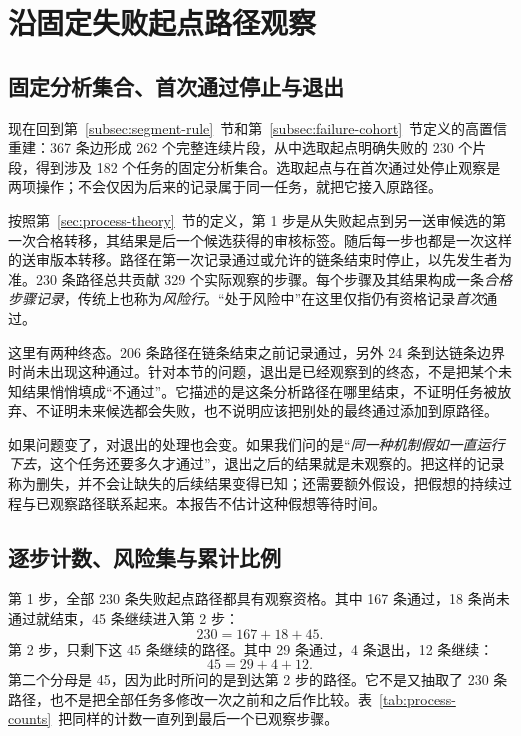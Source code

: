 \section{沿固定失败起点路径观察}
\label{sec:process}

\subsection{固定分析集合、首次通过停止与退出}
\label{subsec:process-cohort}
现在回到第~\ref{subsec:segment-rule}~节和第~\ref{subsec:failure-cohort}~节定义的高置信重建：367 条边形成 262 个完整连续片段，从中选取起点明确失败的 230 个片段，得到涉及 182 个任务的固定分析集合。选取起点与在首次通过处停止观察是两项操作；不会仅因为后来的记录属于同一任务，就把它接入原路径。

按照第~\ref{sec:process-theory}~节的定义，第 1 步是从失败起点到另一送审候选的第一次合格转移，其结果是后一个候选获得的审核标签。随后每一步也都是一次这样的送审版本转移。路径在第一次记录通过或允许的链条结束时停止，以先发生者为准。230 条路径总共贡献 329 个实际观察的步骤。每个步骤及其结果构成一条\emph{合格步骤记录}，传统上也称为\emph{风险行}。“处于风险中”在这里仅指仍有资格记录\emph{首次}通过。

这里有两种终态。206 条路径在链条结束之前记录通过，另外 24 条到达链条边界时尚未出现这种通过。针对本节的问题，退出是已经观察到的终态，不是把某个未知结果悄悄填成“不通过”。它描述的是这条分析路径在哪里结束，不证明任务被放弃、不证明未来候选都会失败，也不说明应该把别处的最终通过添加到原路径。

如果问题变了，对退出的处理也会变。如果我们问的是“\emph{同一种机制假如一直运行下去}，这个任务还要多久才通过”，退出之后的结果就是未观察的。把这样的记录称为删失，并不会让缺失的后续结果变得已知；还需要额外假设，把假想的持续过程与已观察路径联系起来。本报告不估计这种假想等待时间。

\subsection{逐步计数、风险集与累计比例}
\label{subsec:risk-counts}
第 1 步，全部 230 条失败起点路径都具有观察资格。其中 167 条通过，18 条尚未通过就结束，45 条继续进入第 2 步：
\[
230=167+18+45.
\]
第 2 步，只剩下这 45 条继续的路径。其中 29 条通过，4 条退出，12 条继续：
\[
45=29+4+12.
\]
第二个分母是 45，因为此时所问的是到达第 2 步的路径。它不是又抽取了 230 条路径，也不是把全部任务多修改一次之前和之后作比较。表~\ref{tab:process-counts}~把同样的计数一直列到最后一个已观察步骤。

